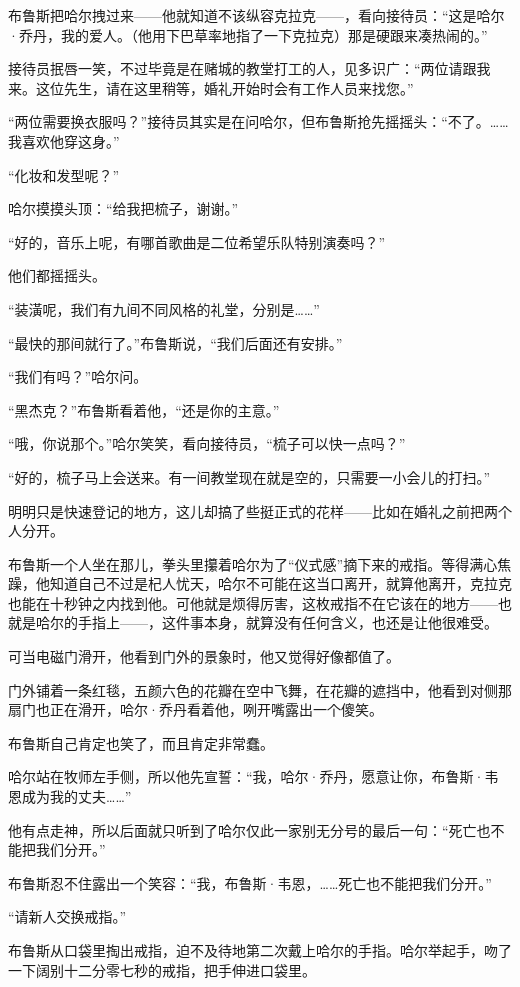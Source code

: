 \documentclass[../main]{subfiles}
\begin{document}
布鲁斯把哈尔拽过来——他就知道不该纵容克拉克——，看向接待员：“这是哈尔·乔丹，我的爱人。（他用下巴草率地指了一下克拉克）那是硬跟来凑热闹的。”

接待员抿唇一笑，不过毕竟是在赌城的教堂打工的人，见多识广：“两位请跟我来。这位先生，请在这里稍等，婚礼开始时会有工作人员来找您。”

“两位需要换衣服吗？”接待员其实是在问哈尔，但布鲁斯抢先摇摇头：“不了。……我喜欢他穿这身。”

“化妆和发型呢？”

哈尔摸摸头顶：“给我把梳子，谢谢。”

“好的，音乐上呢，有哪首歌曲是二位希望乐队特别演奏吗？”

他们都摇摇头。

“装潢呢，我们有九间不同风格的礼堂，分别是\ldots\ldots”

“最快的那间就行了。”布鲁斯说，“我们后面还有安排。”

“我们有吗？”哈尔问。

“黑杰克？”布鲁斯看着他，“还是你的主意。”

“哦，你说那个。”哈尔笑笑，看向接待员，“梳子可以快一点吗？”

“好的，梳子马上会送来。有一间教堂现在就是空的，只需要一小会儿的打扫。”

明明只是快速登记的地方，这儿却搞了些挺正式的花样——比如在婚礼之前把两个人分开。

布鲁斯一个人坐在那儿，拳头里攥着哈尔为了“仪式感”摘下来的戒指。等得满心焦躁，他知道自己不过是杞人忧天，哈尔不可能在这当口离开，就算他离开，克拉克也能在十秒钟之内找到他。可他就是烦得厉害，这枚戒指不在它该在的地方——也就是哈尔的手指上——，这件事本身，就算没有任何含义，也还是让他很难受。

可当电磁门滑开，他看到门外的景象时，他又觉得好像都值了。

门外铺着一条红毯，五颜六色的花瓣在空中飞舞，在花瓣的遮挡中，他看到对侧那扇门也正在滑开，哈尔·乔丹看着他，咧开嘴露出一个傻笑。

布鲁斯自己肯定也笑了，而且肯定非常蠢。

哈尔站在牧师左手侧，所以他先宣誓：“我，哈尔·乔丹，愿意让你，布鲁斯·韦恩成为我的丈夫\ldots\ldots”

他有点走神，所以后面就只听到了哈尔仅此一家别无分号的最后一句：“死亡也不能把我们分开。”

布鲁斯忍不住露出一个笑容：“我，布鲁斯·韦恩，……死亡也不能把我们分开。”

“请新人交换戒指。”

布鲁斯从口袋里掏出戒指，迫不及待地第二次戴上哈尔的手指。哈尔举起手，吻了一下阔别十二分零七秒的戒指，把手伸进口袋里。
\end{document}
